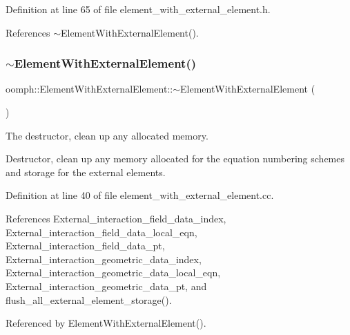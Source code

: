 Definition at line 65 of file element\+\_\+with\+\_\+external\+\_\+element.\+h.



References $\sim$\+Element\+With\+External\+Element().

\mbox{\label{classoomph_1_1ElementWithExternalElement_a50c9f65653e46d6e018b31c0d941d391}} 
\subsubsection{\texorpdfstring{$\sim$\+Element\+With\+External\+Element()}{~ElementWithExternalElement()}}
{\footnotesize\ttfamily oomph\+::\+Element\+With\+External\+Element\+::$\sim$\+Element\+With\+External\+Element (\begin{DoxyParamCaption}{ }\end{DoxyParamCaption})\hspace{0.3cm}{\ttfamily [virtual]}}



The destructor, clean up any allocated memory. 

Destructor, clean up any memory allocated for the equation numbering schemes and storage for the external elements. 

Definition at line 40 of file element\+\_\+with\+\_\+external\+\_\+element.\+cc.



References External\+\_\+interaction\+\_\+field\+\_\+data\+\_\+index, External\+\_\+interaction\+\_\+field\+\_\+data\+\_\+local\+\_\+eqn, External\+\_\+interaction\+\_\+field\+\_\+data\+\_\+pt, External\+\_\+interaction\+\_\+geometric\+\_\+data\+\_\+index, External\+\_\+interaction\+\_\+geometric\+\_\+data\+\_\+local\+\_\+eqn, External\+\_\+interaction\+\_\+geometric\+\_\+data\+\_\+pt, and flush\+\_\+all\+\_\+external\+\_\+element\+\_\+storage().



Referenced by Element\+With\+External\+Element().

\mbox{\label{classoomph_1_1ElementWithExternalElement_ae92f669fb0c1c4d416fde763818eac0b}} 
